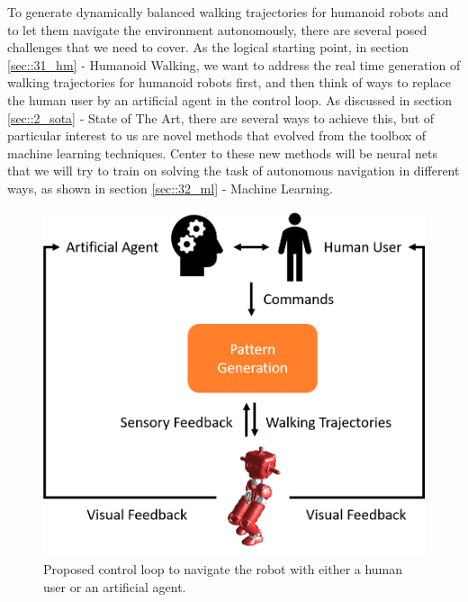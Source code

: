 To generate dynamically balanced walking trajectories for humanoid robots and to let them navigate the environment autonomously, there are several posed challenges that we need to cover. As the logical starting point, in section \ref{sec::31_hm} - Humanoid Walking, we want to address the real time generation of walking trajectories for humanoid robots first, and then think of ways to replace the human user by an artificial agent in the control loop. As discussed in section \ref{sec::2_sota} - State of The Art, there are several ways to achieve this, but of particular interest to us are novel methods that evolved from the toolbox of machine learning techniques. Center to these new methods will be neural nets that we will try to train on solving the task of autonomous navigation in different ways, as shown in section \ref{sec::32_ml} - Machine Learning.
\begin{figure}[h]
	\centering
	\includegraphics[scale=.5]{chapters/03_background/img/control_loop.png}
	\caption{\label{fig::3_cl} Proposed control loop to navigate the robot with either a human user or an artificial agent.}
\end{figure}